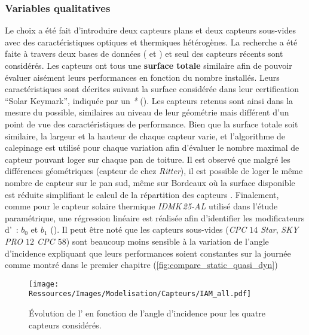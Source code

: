 \subsubsection{Variables qualitatives} %
\label{ssub:variables_qualitatives}
Le choix a été fait d’introduire deux capteurs plans et deux capteurs sous-vides avec
des caractéristiques optiques et thermiques hétérogènes. La recherche a été faite
à travers deux bases de données ( et
) et seul des capteurs récents sont considérés.
Les capteurs ont tous une \textbf{surface totale} similaire afin de pouvoir évaluer
aisément leurs performances en fonction du nombre installés. Leurs caractéristiques
sont décrites suivant la surface considérée dans leur certification \enquote{Solar Keymark},
indiquée par un \emph{*} (). Les capteurs
retenus sont ainsi dans la mesure du possible, similaires au niveau de leur  géométrie
mais différent d’un point de vue des caractéristiques de performance. Bien que
la surface totale soit similaire, la largeur et la hauteur de chaque capteur varie, et
l’algorithme de calepinage est utilisé pour chaque variation afin d’évaluer le
nombre maximal de capteur pouvant loger sur chaque pan de toiture. Il est observé que
malgré les différences géométriques (capteur de chez \textit{Ritter}), il est possible de
loger le même nombre de capteur sur le pan sud, même sur Bordeaux où la surface disponible
est réduite simplifiant le calcul de la répartition des capteurs .
Finalement, comme pour le capteur solaire thermique \textit{IDMK\,25-AL} utilisé dans
l’étude paramétrique, une régression linéaire est réalisée afin d’identifier les
modificateurs d’~: $b_{0}$ et $b_{1}$ (). Il peut
être noté que les capteurs sous-vides (\textit{CPC $14$ Star}, \textit{SKY PRO $12$ CPC
$58$}) sont beaucoup moins sensible à la variation de l’angle d’incidence expliquant que
leurs performances soient constantes sur la journée comme montré dans le premier chapitre
(\ref{fig:compare_static_quasi_dyn})

\begin{figure}
    \centering
    \texttt{[image: Ressources/Images/Modelisation/Capteurs/IAM\_all.pdf]}
    \caption[Évolution de l’ en fonction de l’angle d’incidence]
    {Évolution de l’ en fonction de l’angle d’incidence pour les quatre capteurs considérés.}
    \label{fig:correlation_IAM_all}
\end{figure}

